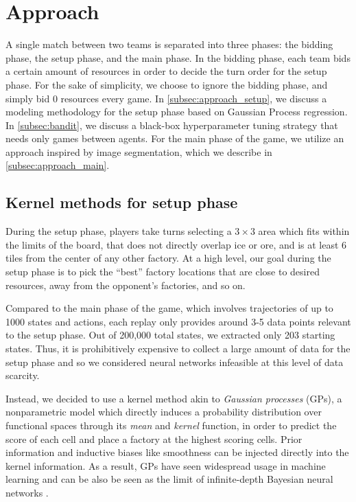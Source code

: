\documentclass[10pt,twocolumn,letterpaper]{article}
\begin{document}
\section{Approach}

A single match between two teams is separated into three
phases: the bidding phase, the setup phase, and the main phase.
In the bidding phase, each team bids a certain amount of
resources in order to decide the turn order for the setup phase.
For the sake of simplicity, we choose to ignore the
bidding phase, and simply bid 0 resources every game.
In \autoref{subsec:approach_setup}, we discuss a modeling methodology
for the setup phase based on Gaussian Process regression.
In \autoref{subsec:bandit}, we discuss a black-box hyperparameter
tuning strategy that needs only games between agents.
For the main phase of the game, we utilize an approach inspired by image
segmentation, which we describe in \autoref{subsec:approach_main}.

\subsection{Kernel methods for setup phase}
\label{subsec:approach_setup}

During the setup phase, players take turns selecting a \( 3 \times 3 \) area
which fits within the limits of the board, that does not directly overlap
ice or ore, and is at least 6 tiles from the center of any other factory.
At a high level, our goal during the setup phase is to pick
the ``best'' factory locations that are close to desired
resources, away from the opponent's factories, and so on.

Compared to the main phase of the game, which involves trajectories
of up to 1000 states and actions, each replay only provides around
3-5 data points relevant to the setup phase.
Out of 200,000 total states, we extracted only 203 starting states.
Thus, it is prohibitively expensive to collect a large
amount of data for the setup phase and so we considered
neural networks infeasible at this level of data scarcity.

Instead, we decided to use a kernel method akin to \emph{Gaussian processes}
(GPs), a nonparametric model which directly induces a probability distribution
over functional spaces through its \emph{mean} and \emph{kernel} function, in
order to predict the score of each cell and place a factory at the highest
scoring cells.
Prior information and inductive biases like smoothness
can be injected directly into the kernel information.
As a result, GPs have seen widespread usage in machine learning
\cite{rasmussen2006gaussian} and can be also be seen as the limit of
infinite-depth Bayesian neural networks \cite{bishop2006pattern}.
\end{document}
